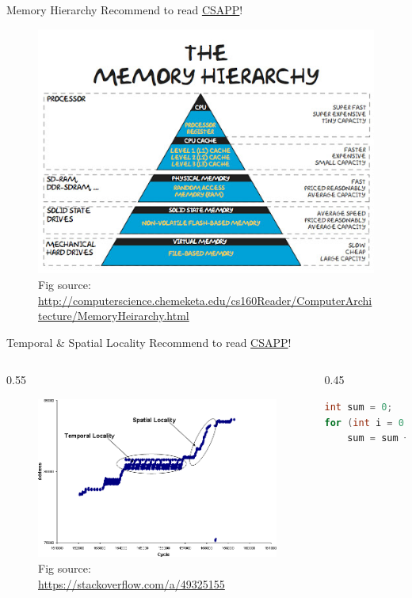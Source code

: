 \documentclass{../TexTemplate/myslide}
\begin{document}
\begin{frame}{Memory Hierarchy}
Recommend to read \href{https://csapp.cs.cmu.edu/}{CSAPP}!
\begin{figure}
\centering
\includegraphics[width=0.7\linewidth]{fig/memory_hierarchy.jpg}
\caption*{\scriptsize Fig source: \url{http://computerscience.chemeketa.edu/cs160Reader/ComputerArchitecture/MemoryHeirarchy.html}}
\end{figure}
\end{frame}

\begin{frame}[fragile]{Temporal \& Spatial Locality}
Recommend to read \href{https://csapp.cs.cmu.edu/}{CSAPP}!
\begin{columns}
\begin{column}{0.55\linewidth}
\begin{figure}
\centering
\includegraphics[width=\linewidth]{fig/locality.png}
\caption*{\scriptsize Fig source: \url{https://stackoverflow.com/a/49325155}}
\end{figure}
\end{column}
\begin{column}{0.45\linewidth}
\begin{lstlisting}[language=c++]
int sum = 0;
for (int i = 0; i < 10; ++i)
    sum = sum + a[i];
\end{lstlisting}
\end{column}
\end{columns}
\end{frame}
\end{document}
